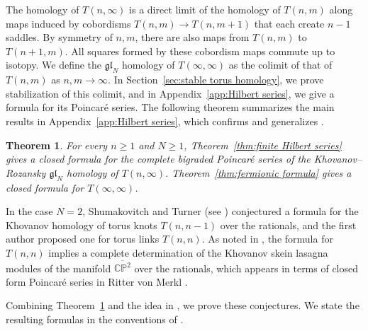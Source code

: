 \documentclass[reqno]{amsart}
\newtheorem{thm}{Theorem}[section]
\theoremstyle{definition}
\theoremstyle{remark}
\newcommand{\gl}{\mathfrak{gl}}
\newcommand{\CP}{\mathbb{CP}}
\begin{document}
The homology of $T(n,\infty)$ is a direct limit of the homology of $T(n,m)$ along maps induced by cobordisms $T(n,m)\to T(n,m+1)$ that each create $n-1$ saddles. By symmetry of $n,m$, there are also maps from $T(n,m)$ to $T(n+1,m)$. All squares formed by these cobordism maps commute up to isotopy. We define the $\mathfrak{gl}_N$ homology of $T(\infty,\infty)$ as the colimit of that of $T(n,m)$ as $n,m\to\infty$. In Section~\ref{sec:stable torus homology}, we prove stabilization of this colimit, and in Appendix~\ref{app:Hilbert series}, we give a formula for its Poincar\'e series. The following theorem summarizes the main results in Appendix~\ref{app:Hilbert series}, which confirms and generalizes \cite[Conjectures~1.7 and 4.9]{gorsky2013stable}.

\begin{thm}\label{thm:stable Hilbert series}
For every $n\ge1$ and $N\ge1$, Theorem~\ref{thm:finite Hilbert series} gives a closed formula for the complete bigraded Poincar\'e series of the Khovanov--Rozansky $\gl_N$ homology of $T(n,\infty)$. Theorem~\ref{thm:fermionic formula} gives a closed formula for $T(\infty,\infty)$.
\end{thm}


In the case $N=2$, Shumakovitch and Turner (see \cite[Conjecture~1.8]{gorsky2013stable}) conjectured a formula for the Khovanov homology of torus knots $T(n,n-1)$ over the rationals, and the first author \cite[Conjectures~6.1 and~6.1\(^{\prime}\)]{ren2024lee} proposed one for torus links $T(n,n)$. As noted in \cite{ren2024khovanov}, the formula for $T(n,n)$ implies a complete determination of the Khovanov skein lasagna modules \cite{morrison2022invariants} of the manifold $\overline{\CP^2}$ over the rationals, which appears in terms of closed form Poincar\'e series in Ritter von Merkl \cite[Section~4.1]{ritter2025computing}.

Combining Theorem~\ref{thm:stable Hilbert series} and the idea in \cite[Section~1.6.2]{ren2026khovanov}, we prove these conjectures. We state the resulting formulas in the conventions of \cite{ren2024lee,ren2024khovanov}.
\end{document}
